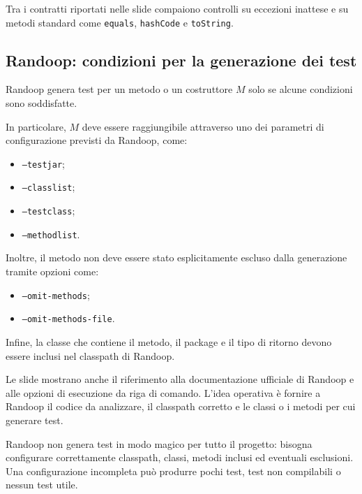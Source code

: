 \begin{notaslide}
Tra i contratti riportati nelle slide compaiono controlli su eccezioni inattese e su metodi standard come \texttt{equals}, \texttt{hashCode} e \texttt{toString}.
\end{notaslide}

\subsection{Randoop: condizioni per la generazione dei test}

Randoop genera test per un metodo o un costruttore \(M\) solo se alcune condizioni sono soddisfatte.

In particolare, \(M\) deve essere raggiungibile attraverso uno dei parametri di configurazione previsti da Randoop, come:

\begin{itemize}
    \item \texttt{--testjar};
    \item \texttt{--classlist};
    \item \texttt{--testclass};
    \item \texttt{--methodlist}.
\end{itemize}

Inoltre, il metodo non deve essere stato esplicitamente escluso dalla generazione tramite opzioni come:

\begin{itemize}
    \item \texttt{--omit-methods};
    \item \texttt{--omit-methods-file}.
\end{itemize}

Infine, la classe che contiene il metodo, il package e il tipo di ritorno devono essere inclusi nel classpath di Randoop.

\begin{notaslide}
Le slide mostrano anche il riferimento alla documentazione ufficiale di Randoop e alle opzioni di esecuzione da riga di comando. L'idea operativa è fornire a Randoop il codice da analizzare, il classpath corretto e le classi o i metodi per cui generare test.
\end{notaslide}

\begin{notaesame}
Randoop non genera test in modo magico per tutto il progetto: bisogna configurare correttamente classpath, classi, metodi inclusi ed eventuali esclusioni. Una configurazione incompleta può produrre pochi test, test non compilabili o nessun test utile.
\end{notaesame}

